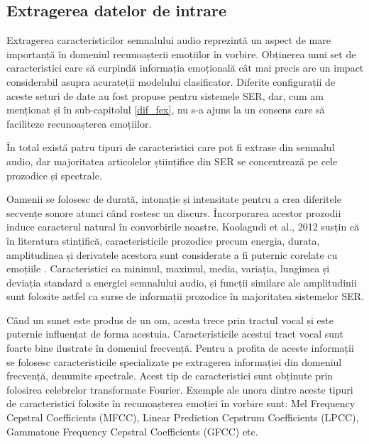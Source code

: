 \documentclass[a4paper,12pt]{book}
\begin{document}
					\subsection{Extragerea datelor de intrare}
						Extragerea caracteristicilor semnalului audio reprezintă un aspect de mare importanță în domeniul recunoașterii emoțiilor în vorbire. Obținerea unui set de caracteristici care să  curpindă informația emoțională cât mai precis are un impact considerabil asupra acurateții modelului clasificator. Diferite configurații de aceste seturi de date au fost propuse pentru sistemele SER, dar, cum am menționat și în sub-capitolul \ref{dif_fex}, nu s-a ajuns la un consens care să faciliteze recunoașterea emoțiilor. \par 
						
						În total există patru tipuri de caracteristici care pot fi extrase din semnalul audio, dar majoritatea articolelor științifice din SER se concentrează pe cele prozodice și spectrale.\par 
						
						Oamenii se folosesc de durată, intonație și intensitate pentru a crea diferitele secvențe sonore atunci când rostesc un discurs. Încorporarea acestor prozodii induce caracterul natural în convorbirile noastre. Koolagudi et al., 2012 \cite{koolagudi} susțin că în literatura stințifică, caracteristicile prozodice precum energia, durata, amplitudinea și derivatele acestora sunt considerate a fi puternic corelate cu emoțiile \cite{dellaert,hcf2,hcf3}. Caracteristici ca minimul, maximul, media, variația, lungimea și deviația standard a energiei semnalului audio, și funcții similare ale amplitudinii sunt folosite astfel ca surse de informații prozodice în majoritatea sistemelor SER. \par 
						
						Când un sunet este produs de un om, acesta trece prin tractul vocal și este puternic influențat de forma acestuia. Caracteristicile acestui tract vocal sunt foarte bine ilustrate în domeniul frecvență. Pentru a profita de aceste informații se folosesc caracteristicile specializate pe extragerea informației din domeniul frecvență, denumite spectrale. Acest tip de caracteristici sunt obținute prin folosirea celebrelor transformate Fourier. Exemple ale unora dintre aceste tipuri de caracteristici folosite în recunoașterea emoției în vorbire sunt: Mel Frequency Cepstral Coefficients (MFCC), Linear Prediction Cepstrum Coefficients (LPCC), Gammatone Frequency Cepstral Coefficients (GFCC) etc. \par 
						
\end{document}
